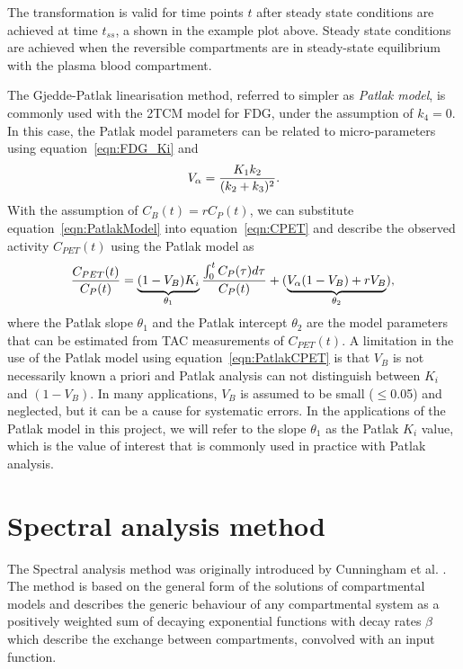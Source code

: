 The transformation is valid for time points $t$ after steady state conditions are achieved at time $t_{ss}$, a shown in the example plot above. Steady state conditions are achieved when the reversible compartments are in steady-state equilibrium with the plasma blood compartment. 

The Gjedde-Patlak linearisation method, referred to simpler as \textit{Patlak model}, is commonly used with the 2TCM model for FDG, under the assumption of $k_4=0$. In this case, the Patlak model parameters can be related to micro-parameters using equation~\ref{eqn:FDG_Ki} and 
%
\begin{equation} 
V_{\alpha}  = \frac{K_1 k_2}{(k_2+k_3)^2} \\ . \\ 
\end{equation}
%
With the assumption of $C_{B}(t) = r C_{P}(t)$, we can substitute equation~\ref{eqn:PatlakModel} into equation~\ref{eqn:CPET} and describe the observed activity $C_{PET}(t)$ using the Patlak model as
%
\begin{equation} 
\frac{C_{PET}(t)}{C_{P}(t)} = \underbrace{(1-V_{B})K_i}_{\theta_1} \frac{\int_{0}^{t} C_{P}(\tau) d\tau}{ C_{P}(t)} +  (\underbrace{V_{\alpha}(1-V_{B})+r V_{B}}_{\theta_2}) \\ , \\
\label{eqn:PatlakCPET}
\end{equation}
%
where the Patlak slope $\theta_1$ and the Patlak intercept $\theta_2$ are the model parameters that can be estimated from TAC measurements of ${C_{PET}}(t)$. 
%
A limitation in the use of the Patlak model using equation~\ref{eqn:PatlakCPET} is that $V_B$ is not necessarily known a priori and Patlak analysis can not distinguish between $K_i$ and $(1-V_B)$. In many applications, $V_B$ is assumed to be small ($\leq$0.05) and neglected, but it can be a cause for systematic errors. 
In the applications of the Patlak model in this project, we will refer to the slope $\theta_1$ as the Patlak $K_i$ value, which is the value of interest that is commonly used in practice with Patlak analysis.


\section{Spectral analysis method}
The Spectral analysis method was originally introduced by Cunningham et al. \cite{Cunningham1993}. The method is based on the general form of the solutions of compartmental models and describes the generic behaviour of any compartmental system as a positively weighted sum of decaying exponential functions with decay rates $\beta$ which describe the exchange between compartments, convolved with an input function. 

